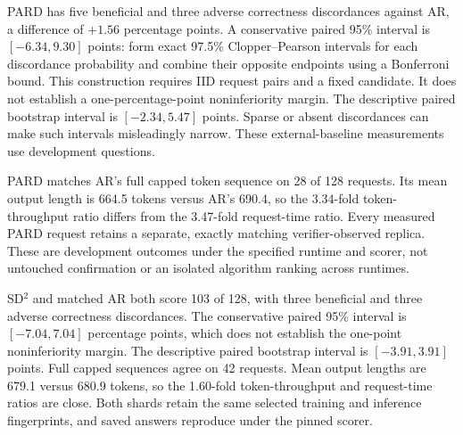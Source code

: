 \documentclass{article}
\begin{document}
\begin{table}[H]
\caption{PARD capped answer quality on 128 exposed MATH development
requests, after an eight-request pilot passed. Both methods use the
same 2048-token cap and public BF16 eager runtime. Cap hits include
all outputs reaching the cap. None ends in EOS exactly at the cap.}
\label{tab:pard-quality}
\centering\footnotesize

\end{table}

PARD has five beneficial and three adverse correctness discordances
against AR, a difference of $+1.56$ percentage points. A conservative
paired 95\% interval is $[-6.34,9.30]$ points: form exact 97.5\%
Clopper--Pearson intervals for each discordance probability and combine
their opposite endpoints using a Bonferroni bound. This construction
requires IID request pairs and a fixed candidate. It does not establish
a one-percentage-point noninferiority margin. The descriptive paired
bootstrap interval is $[-2.34,5.47]$ points. Sparse or absent discordances
can make such intervals misleadingly narrow. These external-baseline measurements use development questions.

PARD matches AR's full capped token sequence on 28 of 128 requests.
Its mean output length is 664.5 tokens versus AR's 690.4, so the
3.34-fold token-throughput ratio differs from the 3.47-fold request-time
ratio. Every measured PARD request retains a separate, exactly matching
verifier-observed replica. These are development outcomes under the
specified runtime and scorer, not untouched confirmation or an isolated
algorithm ranking across runtimes.

\begin{table}[H]
\caption{Selected one-epoch SD$^2$ on the same 128 exposed MATH
development requests, with a 2048-token cap. The public mixed-precision
runtime and matched AR control are retained. Both have 11 cap-length
outputs, none with EOS exactly at the cap.}
\label{tab:sd-square-quality}
\centering\footnotesize

\end{table}

SD$^2$ and matched AR both score 103 of 128, with three beneficial
and three adverse correctness discordances. The conservative paired
95\% interval is $[-7.04,7.04]$ percentage points, which does not
establish the one-point noninferiority margin. The descriptive paired
bootstrap interval is $[-3.91,3.91]$ points. Full capped sequences agree
on 42 requests. Mean output lengths are 679.1 versus 680.9 tokens,
so the 1.60-fold token-throughput and request-time ratios are close.
Both shards retain the same selected training and inference fingerprints,
and saved answers reproduce under the pinned scorer.
\end{document}
